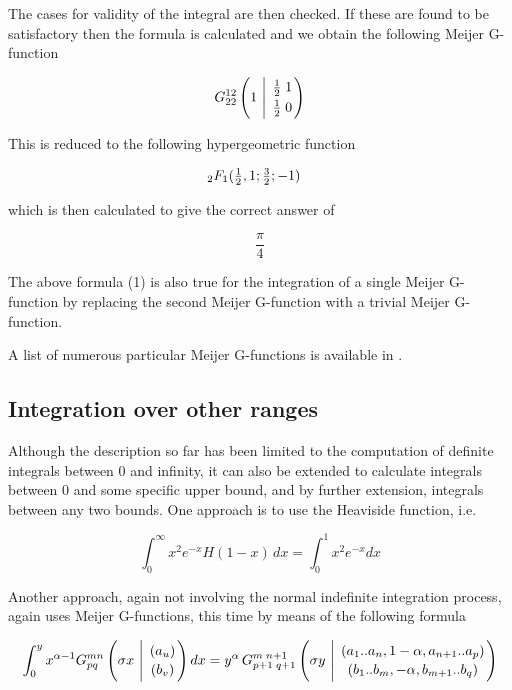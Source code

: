 The cases for validity of the integral are then checked. If these 
are found to be satisfactory then the formula is calculated and we 
obtain the following Meijer G-function 

\begin{displaymath}  
G^{1 2}_{2 2} \left(1 \ \Bigg\vert \ \MeijerGparams{\frac{1}{2} \; 1}{\frac{1}{2} \; 0} \right)
\end{displaymath} 

This is reduced to the following hypergeometric function

\begin{math}
\hspace{50mm} _2F_1 (\frac{1}{2},1;\frac{3}{2};-1 )
\end{math}

which is then calculated to give the correct answer of 

\begin{displaymath}
\frac{\pi}{4}
\end{displaymath}

The above formula (1) is also true for the integration of a single
Meijer G-function by replacing the second Meijer G-function 
with a trivial Meijer G-function.

A list of numerous particular Meijer G-functions is available in 
\cite {Prudnikov}.

\subsection{Integration over other ranges}

Although the description so far has been limited to the computation of
definite integrals between 0 and infinity, it can also be extended to
calculate integrals between 0 and some specific upper bound, and
by further extension, integrals between any two bounds.  One approach is
to use the Heaviside function, i.e.

\begin{displaymath}
\int_{0}^{\infty} x^{2} e^{-x} H(1-x)\,dx = \int_{0}^{1} x^{2} e^{-x}dx
\end{displaymath} 

Another approach, again not involving the normal indefinite integration
process, again uses Meijer G-functions, this time by means of the
following formula

\begin{equation}
\int_{0}^{y} x^{\alpha-1} G^{m n}_{p q} 
\left( \sigma x \  \Bigg\vert \ \MeijerGparams{(a_u)}{(b_v)} \right) dx=%
y^{\alpha}\,G^{m \; n+1}_{p+1 \; q+1} \left( \sigma y \  \Bigg\vert \
\MeijerGparams{( a_1..a_n,1-\alpha,a_{n+1}..a_p)}{(b_1..b_m,-\alpha,b_{m+1}..b_q)} \right) \label{defint:eq2}
\end{equation}

